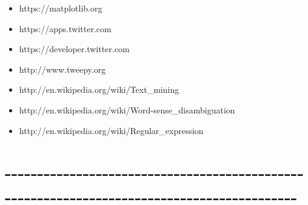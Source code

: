 \documentclass[11pt]{article}
\providecommand{\tightlist}{%
      \setlength{\itemsep}{0pt}\setlength{\parskip}{0pt}}
\begin{document}
\begin{itemize}
\tightlist
\item
  https://matplotlib.org
\item
  https://apps.twitter.com
\item
  https://developer.twitter.com
\item
  http://www.tweepy.org
\item
  http://en.wikipedia.org/wiki/Text\_mining
\item
  http://en.wikipedia.org/wiki/Word-sense\_disambiguation
\item
  http://en.wikipedia.org/wiki/Regular\_expression
\end{itemize}

    \section{-\/-\/-\/-\/-\/-\/-\/-\/-\/-\/-\/-\/-\/-\/-\/-\/-\/-\/-\/-\/-\/-\/-\/-\/-\/-\/-\/-\/-\/-\/-\/-\/-\/-\/-\/-\/-\/-\/-\/-\/-\/-\/-\/-\/-\/-\/-\/-\/-\/-\/-\/-\/-\/-\/-\/-\/-\/-\/-\/-\/-\/-\/-\/-\/-\/-\/-\/-\/-\/-\/-\/-\/-\/-\/-\/-\/-\/-\/-\/-\/-\/-\/-\/-\/-\/-\/-\/-\/-\/-\/-}\label{section}


    
    
    
    
\end{document}
